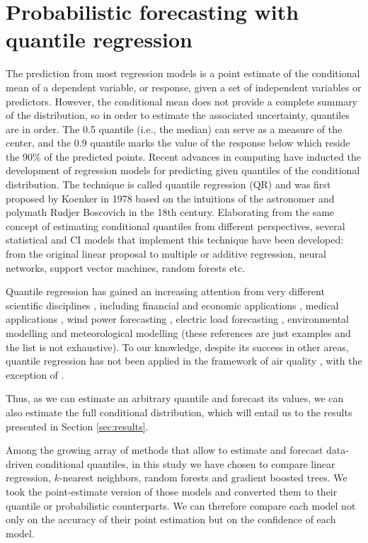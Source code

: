 \documentclass[a4paper,3p,sort&compress]{elsarticle}
\begin{document}
\section{Probabilistic forecasting with quantile regression}
\label{sec:probForec}

The prediction from most regression models is a point estimate of the
conditional mean of a dependent variable, or response, given a set of
independent variables or predictors. However, the conditional mean
does not provide a complete summary of the distribution, so in order
to estimate the associated uncertainty, quantiles are in order. The
0.5 quantile (i.e., the median) can serve as a measure of the center,
and the 0.9 quantile marks the value of the response below which
reside the 90\% of the predicted points. Recent advances in computing
have inducted the development of regression models for predicting
given quantiles of the conditional distribution. The technique is
called quantile regression (QR) and was first proposed by Koenker in
1978 \cite{koenker_quantile_2001} based on the intuitions of the
astronomer and polymath Rudjer Boscovich in the 18th
century. Elaborating from the same concept of estimating conditional
quantiles from different perspectives, several statistical and CI
models that implement this technique have been developed: from the
original linear proposal to multiple or additive regression, neural
networks, support vector machines, random forests etc.

Quantile regression has gained an increasing attention from very
different scientific disciplines \cite{yu_quantile_2003}, including
financial and economic applications \cite{ben_rejeb_financial_2016},
medical applications \cite{jang_quantile_2018}, wind power forecasting
\cite{wan_direct_2017}, electric load forecasting
\cite{lebotsa_short_2018}, environmental modelling
\cite{cade_gentle_2003} and meteorological modelling
\cite{baur_modelling_2004} (these references are just examples and the
list is not exhaustive). To our knowledge, despite its success in
other areas, quantile regression has not been applied in the framework
of air quality , with the exception of
\cite{martinezsilva_forecasting_2016}.

Thus, as we can estimate an arbitrary quantile and forecast its
values, we can also estimate the full conditional distribution, which
will entail us to the results presented in Section \ref{sec:results}.

Among the growing array of methods that allow to estimate and forecast
data-driven conditional quantiles, in this study we have chosen to
compare linear regression, $k$-nearest neighbors, random forests and
gradient boosted trees. We took the point-estimate version of those
models and converted them to their quantile or probabilistic
counterparts. We can therefore compare each model not only on the
accuracy of their point estimation but on the confidence of each
model.
\end{document}
